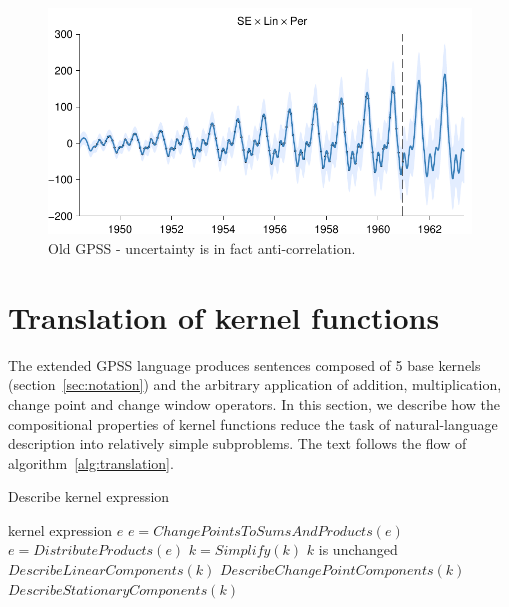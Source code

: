 \documentclass{article}
\begin{document}
\begin{figure}[h]
\centering
\includegraphics[width=0.98\columnwidth]{figures/old-gpss/01-airline-months_2}
\caption{Old GPSS - uncertainty is in fact anti-correlation.}
\label{fig:anti_corr_2}
\end{figure}

\section{Translation of kernel functions}
\label{sec:translation}

The extended GPSS language produces sentences composed of 5 base kernels (section~\ref{sec:notation}) and the arbitrary application of addition, multiplication, change point and change window operators. 
In this section, we describe how the compositional properties of kernel functions reduce the task of natural-language description into relatively simple subproblems.
The text follows the flow of algorithm~\ref{alg:translation}.

\begin{algorithm}[tb]
   \caption{Describe kernel expression}
   \label{alg:translation}
\begin{algorithmic}
    kernel expression $e$
   \STATE $e = {ChangePointsToSumsAndProducts}(e)$
   \STATE $e = {DistributeProducts}(e)$
     \REPEAT
       \STATE $k = Simplify(k)$
     \UNTIL $k$ is unchanged
     \STATE $DescribeLinearComponents(k)$
     \STATE $DescribeChangePointComponents(k)$
     \STATE $DescribeStationaryComponents(k)$
   \ENDFOR
\end{algorithmic}
\end{algorithm}
\end{document}

